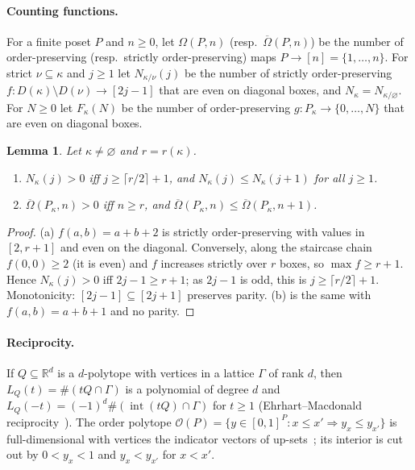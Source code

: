 \documentclass[submission]{FPSAC2027}
\newtheorem{lemma}[theorem]{Lemma}
\theoremstyle{definition}
\theoremstyle{remark}
\newcommand{\R}{\mathbb{R}}
\newcommand{\Om}{\Omega}
\newcommand{\Omb}{\overline{\Omega}}
\newcommand{\ord}{\mathcal{O}}
\newcommand{\interior}{\operatorname{int}}
\begin{document}
\paragraph{Counting functions.} For a finite poset $P$ and $n\ge0$, let $\Om(P,n)$ (resp.\
$\Omb(P,n)$) be the number of order-preserving (resp.\ strictly order-preserving) maps
$P\to[n]=\{1,\dots,n\}$. For strict $\nu\subseteq\kappa$ and $j\ge1$ let $N_{\kappa/\nu}(j)$
be the number of strictly order-preserving $f\colon D(\kappa)\setminus D(\nu)\to[2j-1]$ that are
even on diagonal boxes, and $N_\kappa=N_{\kappa/\varnothing}$. For $N\ge0$ let $F_\kappa(N)$ be
the number of order-preserving $g\colon P_\kappa\to\{0,\dots,N\}$ that are even on diagonal boxes.

\begin{lemma}\label{lem:Npos}
Let $\kappa\ne\varnothing$ and $r=r(\kappa)$.
\begin{enumerate}[label=(\alph*)]
\item $N_\kappa(j)>0$ iff $j\ge\lceil r/2\rceil+1$, and $N_\kappa(j)\le N_\kappa(j+1)$ for all $j\ge1$.
\item $\Omb(P_\kappa,n)>0$ iff $n\ge r$, and $\Omb(P_\kappa,n)\le\Omb(P_\kappa,n+1)$.
\end{enumerate}
\end{lemma}

\begin{proof}
(a) $f(a,b)=a+b+2$ is strictly order-preserving with values in $[2,r+1]$ and even on the diagonal.
Conversely, along the staircase chain $f(0,0)\ge2$ (it is even) and $f$ increases strictly over $r$
boxes, so $\max f\ge r+1$. Hence $N_\kappa(j)>0$ iff $2j-1\ge r+1$; as $2j-1$ is odd, this is
$j\ge\lceil r/2\rceil+1$. Monotonicity: $[2j-1]\subseteq[2j+1]$ preserves parity. (b) is the same
with $f(a,b)=a+b+1$ and no parity.
\end{proof}

\paragraph{Reciprocity.} If $Q\subseteq\R^d$ is a $d$-polytope with vertices in a lattice
$\Gamma$ of rank $d$, then $L_Q(t)=\#(tQ\cap\Gamma)$ is a polynomial of degree $d$ and
$L_Q(-t)=(-1)^d\#(\interior(tQ)\cap\Gamma)$ for $t\ge1$ (Ehrhart--Macdonald
reciprocity~\cite{Mac71,BeckRobins}). The order polytope
$\ord(P)=\{y\in[0,1]^P:x\le x'\Rightarrow y_x\le y_{x'}\}$ is full-dimensional with vertices the
indicator vectors of up-sets~\cite{Sta86}; its interior is cut out by $0<y_x<1$ and $y_x<y_{x'}$
for $x<x'$.
\end{document}
